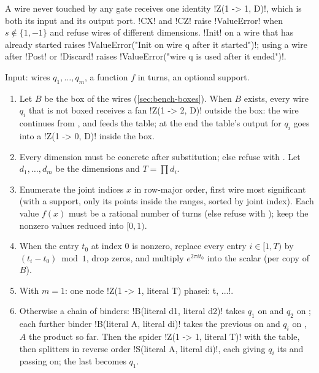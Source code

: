 A wire never touched by any gate receives one identity \azx!Z(1 -> 1, D)!, which is both its
input and its output port. \py!CX! and \py!CZ! raise \py!ValueError! when $s\notin\{1,-1\}$ and
refuse wires of different dimensions. \py!Init! on a wire that has already started raises
\py!ValueError("Init on wire q after it started")!; using a wire after \py!Post! or \py!Discard!
raises \py!ValueError("wire q is used after it ended")!.

\begin{algorithm}\label{alg:bench-phasefn}
Input: wires $q_1,\dots,q_m$, a function $f$ in turns, an optional support.
\begin{enumerate}
\item Let $B$ be the box of the wires (\cref{sec:bench-boxes}). When $B$ exists, every
  wire $q_i$ that is not boxed receives a fan \azx!Z(1 -> 2, D)! outside the box: the wire
  continues from , and  feeds the table; at the end the table's output
  for $q_i$ goes into a \azx!Z(1 -> 0, D)! inside the box.
\item Every dimension must be concrete after substitution; else refuse with . Let $d_1,\dots,d_m$ be the dimensions and $T=\prod d_i$.
\item Enumerate the joint indices $x$ in row-major order, first wire most significant (with a
  support, only its points inside the ranges, sorted by joint index). Each value $f(x)$ must be
  a rational number of turns (else refuse with ); keep the nonzero values reduced into $[0,1)$.
\item When the entry $t_0$ at index 0 is nonzero, replace every entry $i\in[1,T)$ by
  $(t_i - t_0) \bmod 1$, drop zeros, and multiply $e^{2\pi i t_0}$ into the scalar (per copy of
  $B$).
\item With $m=1$: one node \azx!Z(1 -> 1, literal T) phase{i: t, ...}!.
\item Otherwise a chain of binders: \azx!B(literal d1, literal d2)! takes $q_1$ on  and
  $q_2$ on ; each further binder \azx!B(literal A, literal di)! takes the previous
   on  and $q_i$ on , $A$ the product so far. Then the spider
  \azx!Z(1 -> 1, literal T)! with the table, then splitters in reverse order
  \azx!S(literal A, literal di)!, each giving $q_i$ its  and passing  on;
  the last  becomes $q_1$.
\end{enumerate}
\end{algorithm}


